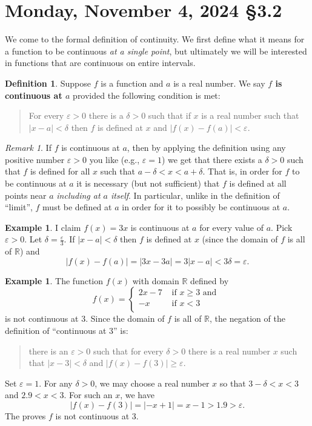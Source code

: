 \documentclass[12pt]{amsart}
\def\Mo{Monday}
\def\d{\delta}
\def\e{\varepsilon}
\newcommand{\R}{{\mathbb{R}}}
\numberwithin{equation}{section}
\theoremstyle{plain} %
\newcommand{\Nov}[3]{\section{#2, November #1, 2024 \quad \S#3}}
\theoremstyle{definition}
\newtheorem{defn}[equation]{Definition}
\newtheorem{ex}[equation]{Example}
\theoremstyle{remark}
\newtheorem{rem}[equation]{Remark}
\begin{document}
\newpage




\Nov{4}{\Mo}{3.2}
We come to the formal definition of continuity. We first define what it means for a function to be continuous {\em at a single point}, but ultimately we will be
interested in functions that are continuous on entire intervals.

\begin{defn} Suppose $f$ is a function and $a$ is a real number.
  We say \textbf{$f$ is
    continuous at $a$} provided the following condition is met:
\begin{quote}
For every $\e > 0$ there is a $\d > 0$ such that if $x$ is a real
number such that $|x - a| < \d$ then $f$ is defined at $x$ and $|f(x) - f(a)| < \e$.
\end{quote}
\end{defn}

\begin{rem} If $f$ is continuous at $a$, then by applying the definition using any positive number $\e > 0$ you like (e.g., $\e = 1$) we get that  
there exists a $\d> 0$ such that $f$ is defined for all $x$ such that $a-\d < x < a+\d$. That is, in order for $f$ to be continuous at $a$ it is necessary (but not sufficient) that $f$ is defined at all points near $a$ {\em including at $a$ itself}.
In particular, unlike in the
  definition of ``limit'', $f$ must be defined at $a$ in order for it to possibly be continuous at $a$.
\end{rem}


\begin{ex} I claim $f(x) = 3x$ is continuous at $a$ for every value of $a$. Pick $\e > 0$. Let $\d = \frac{\e}{3}$. If $|x - a| < \d$ then $f$ is defined at $x$ (since the domain
  of $f$ is all of $\R$) and
  $$
  |f(x) - f(a)| =
  |3x-3a| = 3|x-a| < 3 \d = \e.
  $$
\end{ex}

\begin{ex} The function $f(x)$ with domain $\R$ defined by
$$
f(x) = \begin{cases}
2x - 7 & \text{ if $x \geq 3$ and } \\
-x  & \text{ if $x < 3$} \\
\end{cases}
$$
is not continuous at $3$. Since the domain of $f$ is all of $\R$, the negation of the definition of ``continuous at $3$'' is:
\begin{quote}
there is an $\e > 0$ such that for every $\d > 0$ there is a real number $x$ such that $|x-3| < \d$ and $|f(x) - f(3)| \geq \e$. 
\end{quote}

Set $\e = 1$. For any $\d > 0$, we may choose a real number $x$ so that $3 - \d < x < 3$ and $2.9 < x < 3$. For such an $x$, we have
$$
|f(x) - f(3)| = |-x+1| = x-1 > 1.9 > \e.
$$
The proves $f$ is not continuous at $3$.
\end{ex}
\end{document}
